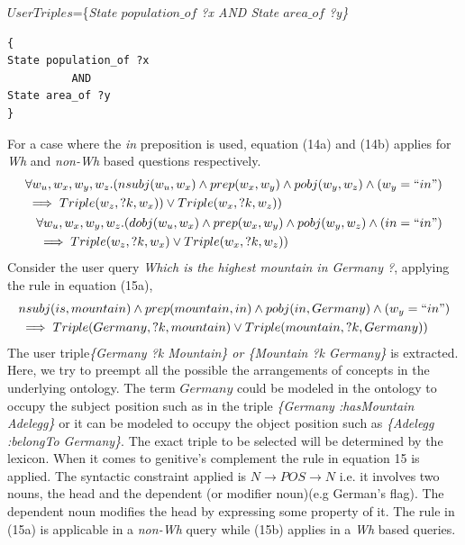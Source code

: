 \documentclass[review]{elsarticle}
\begin{document}
$UserTriples$=\{\textit{State $population\_of$ ?x AND State $area\_of$ ?y\}}
\begin{lstlisting}[caption= User triples]
{
State population_of ?x
          AND  
State area_of ?y
}
\end{lstlisting}
For a case where the \textit{in} preposition is used, equation (14a) and (14b) applies for \textit{Wh} and \textit{non-Wh} based questions respectively.
\begin{subequations}
\begin{align}
\begin{split}
  &\forall   w_u,w_x,w_y,w_z.(nsubj(w_u,w_x)\land prep(w_x,w_y)\land pobj(w_y,w_z)\land(w_y = ``in")\\
 &\implies Triple(w_z,?k, w_x ))\lor Triple(w_x,?k, w_z))
\end{split}\\
\begin{split}
 &\forall   w_u,w_x,w_y,w_z.(dobj(w_u,w_x)\land prep(w_x,w_y)\land pobj(w_y,w_z)\land(in = ``in")\\
 &\implies Triple(w_z,?k,w_x )\lor Triple(w_x,?k, w_z))
\end{split}
\end{align}
\end{subequations}
Consider the user query \textit{Which is the highest mountain in Germany ?}, applying the rule in equation (15a),
\begin{equation*}
\begin{split}
  &nsubj(is,mountain)\land prep(mountain,in)\land pobj(in,Germany)\land(w_y = ``in")\\
 &\implies Triple(Germany,?k, mountain )\lor Triple(mountain ,?k, Germany))
\end{split}
\end{equation*}
The user triple\textit{\{Germany ?k Mountain\} or \{Mountain ?k Germany\}} is extracted.\\
Here,  we try to  preempt all the possible  the arrangements of concepts in the underlying ontology. The term $Germany$ could be modeled in the ontology to occupy the subject position such as in the triple \textit{\{Germany :hasMountain Adelegg\}} or it can be modeled to occupy the object position such as  \textit{\{Adelegg :belongTo Germany\}}. The exact triple to be selected will be determined by the lexicon.
When it comes to  genitive's complement the rule in equation 15 is applied. The syntactic constraint applied is \textit{$ N\rightarrow POS\rightarrow N$} i.e. it involves  two nouns, the head and the dependent (or modifier noun)(e.g German's flag). The dependent noun modifies the head by expressing some property of it. The rule in (15a) is applicable in a \textit{non-Wh} query while (15b) applies in a  \textit{Wh} based queries.
\end{document}
